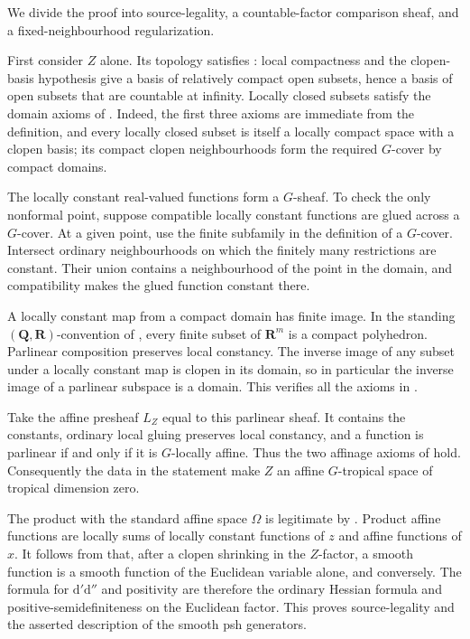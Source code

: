 
We divide the proof into source-legality, a countable-factor comparison
sheaf, and a fixed-neighbourhood regularization.

First consider \(Z\) alone.  Its topology satisfies
\cite[\S3.1.1]{CLD25}: local compactness and the clopen-basis hypothesis
give a basis of relatively compact open subsets, hence a basis of open
subsets that are countable at infinity.  Locally closed subsets satisfy the
domain axioms of \cite[\S3.1.2]{CLD25}.  Indeed, the first three axioms are
immediate from the definition, and every locally closed subset is itself a
locally compact space with a clopen basis; its compact clopen
neighbourhoods form the required \(G\)-cover by compact domains.

The locally constant real-valued functions form a \(G\)-sheaf.  To check
the only nonformal point, suppose compatible locally constant functions are
glued across a \(G\)-cover.  At a given point, use the finite subfamily in
the definition of a \(G\)-cover.  Intersect ordinary neighbourhoods on
which the finitely many restrictions are constant.  Their union contains
a neighbourhood of the point in the domain, and compatibility makes the
glued function constant there.

A locally constant map from a compact domain has finite image.  In the
standing \((\mathbf Q,\mathbf R)\)-convention of
\cite[\S1.8.2]{CLD25}, every finite subset of \(\mathbf R^m\) is a compact
polyhedron.  Parlinear composition preserves local constancy.  The inverse
image of any subset under a locally constant map is clopen in its domain,
so in particular the inverse image of a parlinear subspace is a domain.
This verifies all the axioms in \cite[\S3.1.3]{CLD25}.

Take the affine presheaf \(L_Z\) equal to this parlinear sheaf.  It contains
the constants, ordinary local gluing preserves local constancy, and a
function is parlinear if and only if it is \(G\)-locally affine.  Thus the
two affinage axioms of \cite[\S6.1.1]{CLD25} hold.  Consequently the data
in the statement make \(Z\) an affine \(G\)-tropical space of tropical
dimension zero.

The product with the standard affine space \(\Omega\) is legitimate by
\cite[\S\S9.1.1--9.1.4]{CLD25}.  Product affine functions are locally sums
of locally constant functions of \(z\) and affine functions of \(x\).
It follows from \cite[Definition~6.2.1]{CLD25} that, after a clopen
shrinking in the \(Z\)-factor, a smooth function is a smooth function of
the Euclidean variable alone, and conversely.  The formula for
\(\mathrm d'\mathrm d''\) and positivity are therefore the ordinary
Hessian formula and positive-semidefiniteness on the Euclidean factor.
This proves source-legality and the asserted description of the smooth psh
generators.

